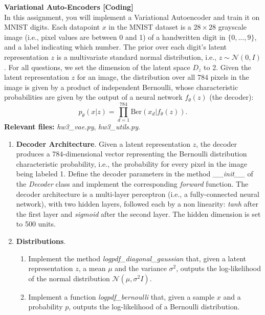 \begin{Q}
	\textbf{\Large Variational Auto-Encoders [Coding]}\\
	
	In this assignment, you will implement a Variational Autoencoder and train it on  MNIST
	digits. Each datapoint $x$ in the MNIST dataset is a $28 \times 28$ grayscale image (i.e., pixel values are between 0 and 1) of a handwritten digit in $\{0, \dots, 9\}$, and a label indicating which number. The prior over each digit's latent representation $z$ is a multivariate standard normal distribution, i.e., $z \sim \mathcal{N}(0,I) $. For all questions, we set the dimension of the latent space $D_z$ to 2. Given the latent representation $z$ for an image, the distribution over all $784$ pixels in the image is given by a product of independent Bernoulli, whose characteristic probabilities are given by the output of a neural network $f_{\theta}(z)$ (the decoder):
	\begin{equation}
	p_{\theta}(x|z) = \prod_{d=1}^{784} \text{Ber}(x_{d}|f_{\theta}(z) ).
	\end{equation}
	\textbf{Relevant files: } \textit{hw3\_vae.py}, \textit{hw3\_utils.py}.
	
	\begin{enumerate}
		\item  \textbf{Decoder Architecture}.
		Given a latent representation $z$, the decoder produces a $784$-dimensional vector representing the Bernoulli distribution characteristic probability, i.e., the probability for every pixel in the image being labeled 1. Define the decoder parameters in the method \textit{\_\_init\_\_}  of the \textit{Decoder} class and implement the corresponding \textit{forward} function. The decoder architecture is a multi-layer perceptron (i.e., a fully-connected neural network), with two hidden layers, followed each by a non linearity: \textit{tanh} after the first layer and \textit{sigmoid} after the second layer. The hidden dimension is set to 500 units.
		
		\item \textbf{Distributions}.
		\begin{enumerate}
			\item Implement the method \textit{logpdf\_diagonal\_gaussian} that, given a latent representation $z$, a mean $\mu$ and the variance $\sigma^2$, outputs the log-likelihood of the normal distribution  $\mathcal{N}(\mu,\sigma^2 I)$.
			
			\item  Implement a function \textit{logpdf\_bernoulli} that, given a sample $x$ and a probability $p$,  outputs the log-likelihood of a Bernoulli distribution.
			

\end{enumerate}
\end{enumerate}
\end{Q}
